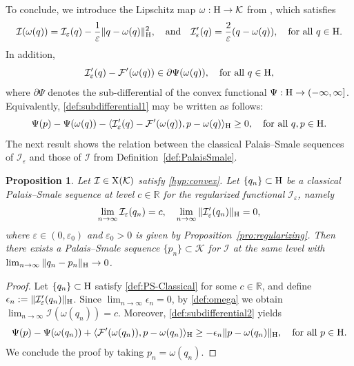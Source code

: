 \documentclass{article}
\newcommand{\boK}{\mathcal{K}}
\newcommand{\boI}{\mathcal{I}}
\newcommand{\R}{\mathbb{R}}
\newcommand{\boF}{\mathcal{F}}
\newcommand{\Hilb}{{\textnormal H}}
\newcommand{\X}{{\textnormal X}}
\newtheorem{proposition}{Proposition}[section]
\theoremstyle{definition}
\begin{document}
To conclude, we introduce the Lipschitz map $\omega:\Hilb\to\boK$  from \cite[pg. 310]{Eke-Las}, which satisfies
\begin{equation}\label{def:omega}
	\boI(\omega(q))=\boI_\varepsilon(q)-\dfrac{1}{\varepsilon}\|q-\omega(q)\|_\Hilb^2,\quad\hbox{and}\quad   \boI_\varepsilon'(q)=\frac{2}{\varepsilon}(q-\omega(q)),\quad \hbox{for all }q\in\Hilb.
\end{equation}
In addition,
\begin{equation}\label{def:subdifferential1}
	\boI'_\varepsilon(q)-\boF'(\omega(q))\in\partial\Psi(\omega(q)),\quad\hbox{for all }q\in\Hilb,
\end{equation}
where $\partial\Psi$ denotes the sub-differential of the convex functional $\Psi:\Hilb\to(-\infty,\infty]$. Equivalently, \eqref{def:subdifferential1} may be written as follows:
\begin{equation}\label{def:subdifferential2}
	\Psi(p)-\Psi(\omega(q))-\langle \boI'_\varepsilon(q)-\boF'(\omega(q)),p-\omega(q)\rangle_\Hilb\geq0,\quad\hbox{for all }q,p\in\Hilb.
\end{equation}
The next result shows the relation between the classical Palais--Smale sequences of $\mathcal{I}_\varepsilon$ and those of $\mathcal{I}$ from Definition~\ref{def:PalaisSmale}.
\begin{proposition}\label{Pro:EquivalencePalaisSmale}
	Let $\boI\in\X(\boK)$ satisfy \eqref{hyp:convex}. Let $\{q_n\}\subset\Hilb$ be a classical Palais--Smale sequence at level $c\in\R$ for the regularized functional $\boI_\varepsilon$, namely
	\begin{equation}\label{def:PS-Classical}
		\lim_{n\to\infty}\boI_\varepsilon(q_n)=c,\quad\lim_{n\to\infty}\|\boI'_\varepsilon(q_n)\|_\Hilb=0,
	\end{equation}
    where $\varepsilon\in (0,\varepsilon_0)$ and $\varepsilon_0>0$ is given by Proposition~\ref{pro:regularizing}. Then there exists a Palais--Smale sequence $\{p_n\}\subset\boK$ for $\boI$ at the same level with $\lim_{n\to\infty}\|q_n-p_n\|_\Hilb\to 0$.	
\end{proposition}
\begin{proof}
Let $\{q_n\}\subset\Hilb$ satisfy \eqref{def:PS-Classical} for some $c\in\R$, and define $\epsilon_n:= \|\boI_\varepsilon'(q_n)\|_\Hilb$. Since $\lim_{n\to\infty}\epsilon_n=0$, by \eqref{def:omega} we obtain $\lim_{n\to\infty}\boI(\omega(q_n))=c.$ Moreover, \eqref{def:subdifferential2} yields
\begin{equation*}\label{Proof-Ps2}
	\Psi(p)-\Psi(\omega(q_n))+\langle \boF'(\omega(q_n)),p-\omega(q_n)\rangle_\Hilb\geq-\epsilon_n\|p-\omega(q_n)\|_\Hilb,\quad\hbox{for all }p\in\Hilb.
\end{equation*}
We conclude the proof by taking $p_n=\omega(q_n)$.
\end{proof}
\end{document}
